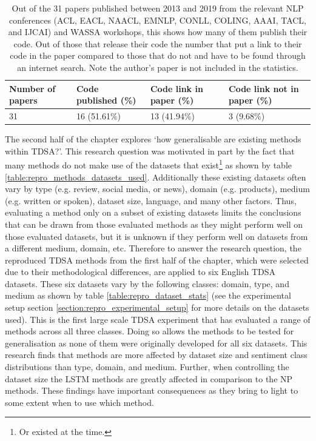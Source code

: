 \begin{table}[!h]
    \centering
    \begin{tabular}{|p{}|p{}|p{}|p{}|}
    \hline
         Number of papers & Code published (\%) &	Code link in paper (\%) &	Code link not in paper (\%)  \\
         \hline
         31 & 16 (51.61\%) & 13 (41.94\%) &	3 (9.68\%) \\
    \hline
    \end{tabular}
    \caption{Out of the 31 papers published between 2013 and 2019 from the relevant NLP conferences (ACL, EACL, NAACL, EMNLP, CONLL, COLING, AAAI, TACL, and IJCAI) and WASSA workshops, this shows how many of them publish their code. Out of those that release their code the number that put a link to their code in the paper compared to those that do not and have to be found through an internet search. Note the author's paper \citep{moore-rayson-2018-bringing} is not included in the statistics.}
    \label{table:repro_papers_stats}
\end{table}

The second half of the chapter explores  `how generalisable are existing methods within TDSA?'. This research question was motivated in part by the fact that many methods do not make use of the datasets that exist\footnote{Or existed at the time.} as shown by table \ref{table:repro_methods_datasets_used}. Additionally these existing datasets often vary by type (e.g. review, social media, or news), domain (e.g. products), medium (e.g. written or spoken), dataset size, language, and many other factors. Thus, evaluating a method only on a subset of existing datasets limits the conclusions that can be drawn from those evaluated methods as they might perform well on those evaluated datasets, but it is unknown if they perform well on datasets from a different medium, domain, etc. Therefore to answer the research question, the reproduced TDSA methods from the first half of the chapter, which were selected due to their methodological differences, are applied to six English TDSA datasets. These six datasets vary by the following classes: domain, type, and medium as shown by table \ref{table:repro_dataset_stats} (see the experimental setup section \ref{section:repro_experimental_setup} for more details on the datasets used). This is the first large scale TDSA experiment that has evaluated a range of methods across all three classes. Doing so allows the methods to be tested for generalisation as none of them were originally developed for all six datasets. This research finds that methods are more affected by dataset size and sentiment class distributions than type, domain, and medium. Further, when controlling the dataset size the LSTM methods are greatly affected in comparison to the NP methods. These findings have important consequences as they bring to light to some extent when to use which method.  


